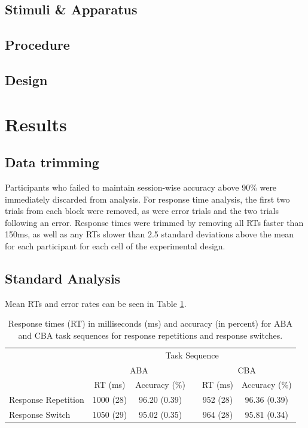 \documentclass[a4paper, jou, natbib]{apa6}
\begin{document}
\subsection{Stimuli \& Apparatus}

\subsection{Procedure}

\subsection{Design}


\section{Results}


\subsection{Data trimming}
Participants who failed to maintain session-wise accuracy above 90\% were immediately discarded from analysis. For response time analysis, the first two trials from each block were removed, as were error trials and the two trials following an error. Response times were trimmed by removing all RTs faster than 150ms, as well as any RTs slower than 2.5 standard deviations above the mean for each participant for each cell of the experimental design. 

\subsection{Standard Analysis}
Mean RTs and error rates can be seen in Table \ref{tab:behaviouralData}.


\begin{table}[htbp]
\centering
\caption{Response times (RT) in milliseconds (ms) and accuracy (in percent) for ABA and CBA task sequences for response repetitions and response switches.}
\label{my-label}
\begin{tabular}{lccccc}
\hline
                    & \multicolumn{5}{c}{Task Sequence}                       \\ \cline{2-6} 
                    & \multicolumn{2}{c}{ABA}   &  & \multicolumn{2}{c}{CBA}  \\ \cline{2-3} \cline{5-6} 
                    & RT (ms)   & Accuracy (\%) &  & RT (ms)  & Accuracy (\%) \\ \hline
Response Repetition & 1000 (28) & 96.20 (0.39)  &  & 952 (28) & 96.36 (0.39) \\
Response Switch     & 1050 (29) & 95.02 (0.35)  &  & 964 (28) & 95.81 (0.34) \\ \hline
\end{tabular}
\label{tab:behaviouralData}
\end{table}
\end{document}
